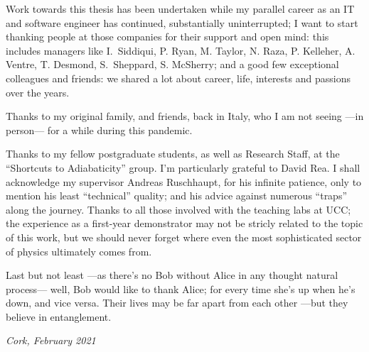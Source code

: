 {
\small
Work towards this thesis has been undertaken while my parallel career
as an IT and software engineer has continued,
substantially uninterrupted;
I want to start thanking people at those companies for their support and open mind:
this includes managers like
I.~Siddiqui, P. Ryan, M. Taylor, N. Raza, P. Kelleher, A. Ventre, T. Desmond, S.~Sheppard, S. McSherry;
and a good few exceptional colleagues and friends:
we shared a lot about career, life, interests and passions over the years.

Thanks to my original family, and friends, back in Italy,
who I am not seeing ---in person--- for a while during this pandemic.

Thanks to my fellow postgraduate students,
as well as Research Staff,
at the ``Shortcuts to Adiabaticity'' group.
I'm particularly grateful to David Rea.
I shall acknowledge my supervisor Andreas Ruschhaupt, for his infinite patience,
only to mention his least ``technical'' quality;
and his advice against numerous ``traps'' along the journey.
Thanks to all those involved with the teaching labs at UCC;
the  experience as a  first-year demonstrator may not be stricly related to the topic of this work,
but we should never forget where even the most sophisticated sector of physics
ultimately comes from.

Last but not least ---as there's no Bob without Alice in any thought natural process---
well, Bob would like to thank Alice;
for every time she’s up when he’s down, and vice versa.
Their lives may be far apart from each other ---but they believe in entanglement.

\textit{Cork, February 2021}
}